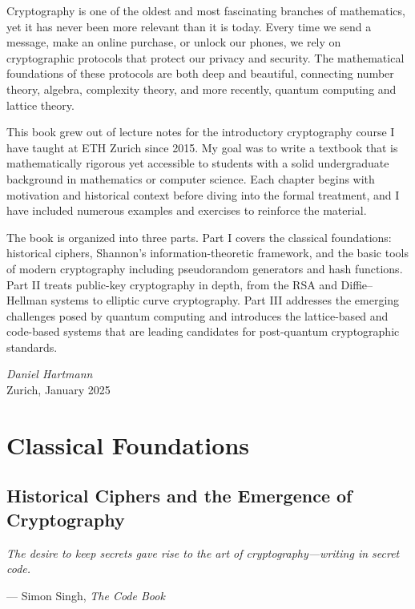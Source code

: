 \documentclass[12pt,a4paper,openany]{book}
\theoremstyle{definition}
\theoremstyle{plain}
\begin{document}
Cryptography is one of the oldest and most fascinating branches of mathematics, yet it has never been more relevant than it is today. Every time we send a message, make an online purchase, or unlock our phones, we rely on cryptographic protocols that protect our privacy and security. The mathematical foundations of these protocols are both deep and beautiful, connecting number theory, algebra, complexity theory, and more recently, quantum computing and lattice theory.

This book grew out of lecture notes for the introductory cryptography course I have taught at ETH Zurich since 2015. My goal was to write a textbook that is mathematically rigorous yet accessible to students with a solid undergraduate background in mathematics or computer science. Each chapter begins with motivation and historical context before diving into the formal treatment, and I have included numerous examples and exercises to reinforce the material.

The book is organized into three parts. Part I covers the classical foundations: historical ciphers, Shannon's information-theoretic framework, and the basic tools of modern cryptography including pseudorandom generators and hash functions. Part II treats public-key cryptography in depth, from the RSA and Diffie--Hellman systems to elliptic curve cryptography. Part III addresses the emerging challenges posed by quantum computing and introduces the lattice-based and code-based systems that are leading candidates for post-quantum cryptographic standards.

\vspace{0.5cm}
\noindent\textit{Daniel Hartmann}\\
Zurich, January 2025

\tableofcontents

\mainmatter

\part{Classical Foundations}

\chapter{Historical Ciphers and the Emergence of Cryptography}

\epigraph{\textit{The desire to keep secrets gave rise to the art of cryptography---writing in secret code.}}{--- Simon Singh, \textit{The Code Book}}
\end{document}
